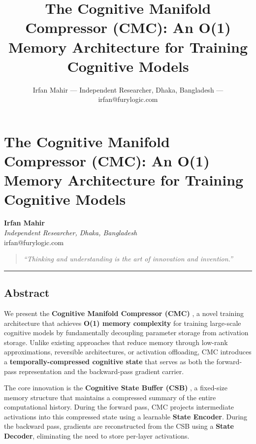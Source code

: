 \documentclass[
  11pt,
  a4paper,
]{article}
\title{The Cognitive Manifold Compressor (CMC): An O(1) Memory
Architecture for Training Cognitive Models}
\author{Irfan Mahir --- Independent Researcher, Dhaka, Bangladesh ---
irfan@furylogic.com}
\date{}
\begin{document}
\maketitle

{
\hypersetup{linkcolor=}
\setcounter{tocdepth}{3}
\tableofcontents
}
\section{The Cognitive Manifold Compressor (CMC): An O(1) Memory
Architecture for Training Cognitive
Models}\label{the-cognitive-manifold-compressor-cmc-an-o1-memory-architecture-for-training-cognitive-models}

\textbf{Irfan Mahir}\\
\emph{Independent Researcher, Dhaka, Bangladesh}\\
irfan@furylogic.com

\begin{quote}
\emph{``Thinking and understanding is the art of innovation and
invention.''}
\end{quote}

\begin{center}\rule{0.5\linewidth}{0.5pt}\end{center}

\subsection{Abstract}\label{abstract}

We present the \textbf{Cognitive Manifold Compressor (CMC)} , a novel
training architecture that achieves \textbf{O(1) memory complexity} for
training large-scale cognitive models by fundamentally decoupling
parameter storage from activation storage. Unlike existing approaches
that reduce memory through low-rank approximations, reversible
architectures, or activation offloading, CMC introduces a
\textbf{temporally-compressed cognitive state} that serves as both the
forward-pass representation and the backward-pass gradient carrier.

The core innovation is the \textbf{Cognitive State Buffer (CSB)} , a
fixed-size memory structure that maintains a compressed summary of the
entire computational history. During the forward pass, CMC projects
intermediate activations into this compressed state using a learnable
\textbf{State Encoder}. During the backward pass, gradients are
reconstructed from the CSB using a \textbf{State Decoder}, eliminating
the need to store per-layer activations.
\end{document}
